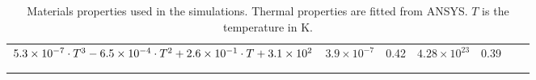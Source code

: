 \begin{table}
\begin{tabular}{p{1.7cm}  R{3cm}  R{3cm}  R{1.8cm}  R{1cm} R{1.8cm}  R{1cm}}
        $5.3\times 10^{-7}\cdot T^3\newline %
        -6.5\times 10^{-4}\cdot T^2\newline %
        +2.6\times 10^{-1}\cdot T\newline %
        +3.1\times 10^2$ & %

        $3.9\times 10^{-7}$ & %
        0.42&%
        $4.28\times 10^{23}$ & 0.39\\
        \\
        \\
    \end{tabular}
    \caption{Materials properties used in the simulations. Thermal properties are fitted from ANSYS. $T$ is the temperature in \si{K}.}
\end{table}

